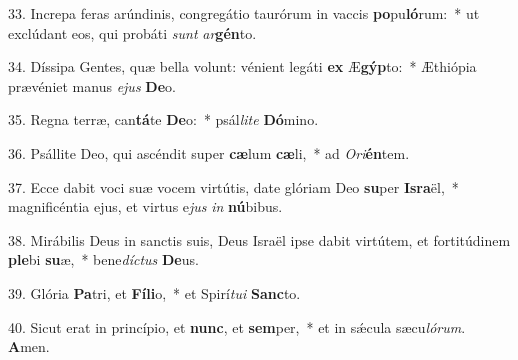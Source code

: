 33. Increpa feras arúndinis, congregátio taurórum in vaccis \textbf{po}pu\textbf{ló}rum:~*  ut exclúdant eos, qui probáti \textit{sunt} \textit{ar}\textbf{gén}to.\

34. Díssipa Gentes, quæ bella volunt: vénient legáti \textbf{ex} Æ\textbf{gýp}to:~*  Æthiópia prævéniet manus \textit{e}\textit{jus} \textbf{De}o.\

35. Regna terræ, can\textbf{tá}te \textbf{De}o:~*  psál\textit{li}\textit{te} \textbf{Dó}mino.\

36. Psállite Deo, qui ascéndit super \textbf{cæ}lum \textbf{cæ}li,~*  ad \textit{O}\textit{ri}\textbf{én}tem.\

37. Ecce dabit voci suæ vocem virtútis, date glóriam Deo \textbf{su}per \textbf{Is}\textbf{ra}ël,~*  magnificéntia ejus, et virtus e\textit{jus} \textit{in} \textbf{nú}bibus.\

38. Mirábilis Deus in sanctis suis, Deus Israël ipse dabit virtútem, et fortitúdinem \textbf{ple}bi \textbf{su}æ,~*  bene\textit{díc}\textit{tus} \textbf{De}us.\

39. Glória \textbf{Pa}tri, et \textbf{Fí}\textbf{li}o,~*  et Spirí\textit{tu}\textit{i} \textbf{Sanc}to.\

40. Sicut erat in princípio, et \textbf{nunc}, et \textbf{sem}per,~*  et in sǽcula sæcu\textit{ló}\textit{rum}. \textbf{A}men.\

